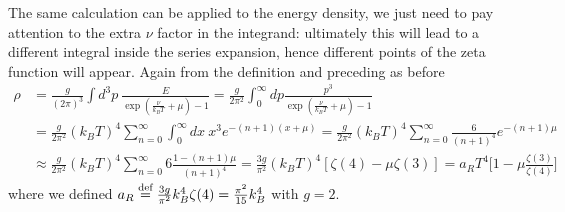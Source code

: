 The same calculation can be applied to the energy density, we just need to pay attention to the extra $\nu$ factor in the integrand: ultimately this will lead to a different integral inside the series expansion, hence different points of the zeta function will appear. Again from the definition and preceding as before
\begin{align}
    \rho&=\frac{g}{(2\pi)^3}\int d^3p\ \frac{E}{\exp(\frac{\nu}{k_BT}+\mu)-1}=\frac{g}{2\pi^2}\int_0^\infty dp \frac{p^3}{\exp(\frac{\nu}{k_BT}+\mu)-1}\nonumber\\
    &=\frac{g}{2\pi^2}(k_BT)^4\sum_{n=0}^{\infty}\int_0^\infty dx\ x^3e^{-(n+1)(x+\mu)}\nonumber=\frac{g}{2\pi^2}(k_BT)^4\sum_{n=0}^{\infty}\frac{6}{(n+1)^4}e^{-(n+1)\mu}\\&\approx\frac{g}{2\pi^2}(k_BT)^4\sum_{n=0}^{\infty}6\frac{1-(n+1)\mu}{(n+1)^4}=\frac{3g}{\pi^2}(k_BT)^4[\zeta(4)-\mu\zeta(3)]=a_RT^4\bigg[1-\mu\frac{\zeta(3)}{\zeta(4)}\bigg]\,\label{eq:SmallChemicalPotential_rho}
\end{align}
where we defined $a_R\stackrel{\text{def}}{=}\frac{3g}{\pi^2}k_B^4\zeta(4)=\frac{\pi^2}{15}k_B^4$ with $g=2$.\\